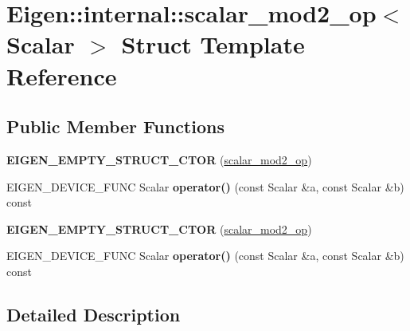 \hypertarget{struct_eigen_1_1internal_1_1scalar__mod2__op}{}\section{Eigen\+:\+:internal\+:\+:scalar\+\_\+mod2\+\_\+op$<$ Scalar $>$ Struct Template Reference}
\label{struct_eigen_1_1internal_1_1scalar__mod2__op}
\subsection*{Public Member Functions}
\begin{DoxyCompactItemize}
\item 
\mbox{\label{struct_eigen_1_1internal_1_1scalar__mod2__op_a1d23174a92f1230bfb505215e9589a54}} 
{\bfseries E\+I\+G\+E\+N\+\_\+\+E\+M\+P\+T\+Y\+\_\+\+S\+T\+R\+U\+C\+T\+\_\+\+C\+T\+OR} (\hyperlink{struct_eigen_1_1internal_1_1scalar__mod2__op}{scalar\+\_\+mod2\+\_\+op})
\item 
\mbox{\label{struct_eigen_1_1internal_1_1scalar__mod2__op_a18856f6c1f6a9495fb8177bb6a4cd29d}} 
E\+I\+G\+E\+N\+\_\+\+D\+E\+V\+I\+C\+E\+\_\+\+F\+U\+NC Scalar {\bfseries operator()} (const Scalar \&a, const Scalar \&b) const
\item 
\mbox{\label{struct_eigen_1_1internal_1_1scalar__mod2__op_a1d23174a92f1230bfb505215e9589a54}} 
{\bfseries E\+I\+G\+E\+N\+\_\+\+E\+M\+P\+T\+Y\+\_\+\+S\+T\+R\+U\+C\+T\+\_\+\+C\+T\+OR} (\hyperlink{struct_eigen_1_1internal_1_1scalar__mod2__op}{scalar\+\_\+mod2\+\_\+op})
\item 
\mbox{\label{struct_eigen_1_1internal_1_1scalar__mod2__op_a18856f6c1f6a9495fb8177bb6a4cd29d}} 
E\+I\+G\+E\+N\+\_\+\+D\+E\+V\+I\+C\+E\+\_\+\+F\+U\+NC Scalar {\bfseries operator()} (const Scalar \&a, const Scalar \&b) const
\end{DoxyCompactItemize}


\subsection{Detailed Description}
